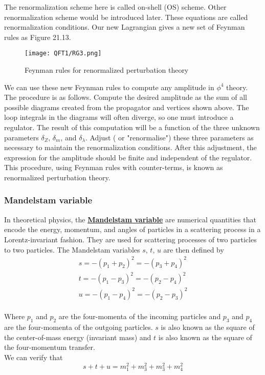 \documentclass[cyan]{elegantnote}
\begin{document}
\noindent
The renormalization scheme here is called on-shell (OS) scheme. Other renormalization scheme would be introduced later.
These equations are called renormalization conditions.
Our new Lagrangian gives a new set of Feynman rules as Figure 21.13.
\begin{figure}[!h]
\centering
\texttt{[image: QFT1/RG3.png]}
\caption{Feynman rules for renormalized perturbation theory}
\end{figure}

\noindent
We can use these new Feynman rules to compute any amplitude in $\phi^4$ theory. The procedure is as follows. Compute the desired amplitude as the sum of all possible diagrams created from the propagator and vertices shown above. The loop integrals in the diagrams will often diverge, so one must introduce a regulator. The result of this computation will be a function of the three unknown parameters $\delta_Z$, $\delta_m$, and $\delta_{\lambda}$. Adjust ( or "renormalise") these three parameters as necessary to maintain the renormalization conditions. After this adjustment, the expression for the amplitude should be finite and independent of the regulator.
\\
This procedure, using Feynman rules with counter-terms, is known as renormalized perturbation theory. 

\subsubsection{Mandelstam variable}
In theoretical physics, the \href{https://en.wikipedia.org/wiki/Mandelstam_variables}{\textbf{Mandelstam variable}}  are numerical quantities that encode the energy, momentum, and angles of particles in a scattering process in a Lorentz-invariant fashion. They are used for scattering processes of two particles to two particles. 
The Mandelstam variables $s$, $t$, $u$ are then defined by
\begin{eqnarray}
s=-(p_{1}+p_{2})^{2}=-(p_{3}+p_{4})^{2} \nonumber \\
t=-(p_{1}-p_{3})^{2}=-(p_{2}-p_{4})^{2} \nonumber \\
u=-(p_{1}-p_{4})^{2}=-(p_{2}-p_{3})^{2} \nonumber
\end{eqnarray}
\\
Where $p_1$ and $p_2$ are the four-momenta of the incoming particles and $p_3$ and $p_4$ are the four-momenta of the outgoing particles.
$s$ is also known as the square of the center-of-mass energy (invariant mass) and $t$ is also known as the square of the four-momentum transfer.\\
We can verify that
\[s+t+u = m_1^2 + m_3^2 + m_3^2 +m_4^2\]
\end{document}
